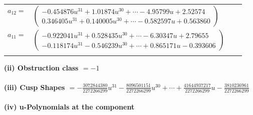 \documentclass[1p]{elsarticle_modified}
\theoremstyle{definition}
\begin{document}
\begin{tabular}{m{7pt} m{180pt} m{7pt} m{180pt} }
\flushright $a_{12}=$&$\begin{pmatrix}-0.454876 u^{31}+1.01874 u^{30}+\cdots-4.95799 u+2.52574\\0.346405 u^{31}+0.140005 u^{30}+\cdots-0.582597 u+0.563860\end{pmatrix}$ \\
\flushright $a_{11}=$&$\begin{pmatrix}-0.922041 u^{31}+0.528435 u^{30}+\cdots-6.30347 u+2.79655\\-0.118174 u^{31}-0.546239 u^{30}+\cdots+0.865171 u-0.393606\end{pmatrix}$\\&\end{tabular}
\flushleft \textbf{(ii) Obstruction class $= -1$}\\~\\
\flushleft \textbf{(iii) Cusp Shapes $= -\frac{3072844380}{2272266299} u^{31}-\frac{8096501151}{2272266299} u^{30}+\cdots+\frac{41644937217}{2272266299} u-\frac{3810236961}{2272266299}$}\\~\\
\newpage\renewcommand{\arraystretch}{1}
\flushleft \textbf{(iv) u-Polynomials at the component}\newline \\
\end{document}
